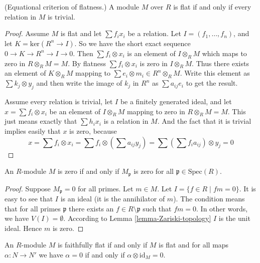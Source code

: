 \begin{lemma}
\label{lemma-flat-eq}
(Equational criterion of flatness.)
A module $M$ over $R$ is flat if and only if
every relation in $M$ is trivial.
\end{lemma}

\begin{proof}
Assume $M$ is flat and let $\sum f_i x_i$ be a relation.
Let $I = (f_1,\ldots,f_n)$, and let $K = \text{ker}(R^n \to I)$.
So we have the short exact sequence
$0\to K \to R^n \to I\to 0$. Then $\sum f_i \otimes x_i$
is an element of $I\otimes_R M$ which maps
to zero in $R\otimes_R M = M$. By flatness
$\sum f_i \otimes x_i$ is zero in $I\otimes_R M$.
Thus there exists an element of $K\otimes_R M$ mapping
to $\sum e_i \otimes m_i \in R^n\otimes_R M$.
Write this element as $\sum k_j \otimes y_j$
and then write the image of $k_j$ in $R^n$ as
$\sum a_{ij} e_i$ to get the result.

\medskip\noindent
Assume every relation is trivial, let $I$
be a finitely generated ideal, and let $x = \sum f_i\otimes x_i$
be an element of $I\otimes_R M$ mapping to zero in $R\otimes_R M = M$.
This just means exactly that $\sum h_i x_i$ is a relation in
$M$. And the fact that it is trivial implies easily that
$x$ is zero, because
$$
x
=
\sum f_i \otimes x_i
=
\sum f_i \otimes (\sum a_{ij}y_j)
=
\sum (\sum f_i a_{ij}) \otimes y_j
=
0
$$
\end{proof}

\begin{lemma}
\label{lemma-characterize-zero-local}
An $R$-module $M$ is zero if and only if $M_{\mathfrak p}$ is
zero for all $\mathfrak p \in \text{Spec}(R)$.
\end{lemma}

\begin{proof}
Suppose $M_{\mathfrak p} = 0$ for all primes. 
Let $m \in M$. Let $I = \{f \in R \mid fm = 0\}$.
It is easy to see that $I$ is an ideal (it is the
annihilator of $m$). The condition means that for
all primes $\mathfrak p$ there exists an $f \in R \setminus
\mathfrak p$ such that $fm =0$. In other words,
we have $V(I) = \emptyset$. According to Lemma 
\ref{lemma-Zariski-topology} $I$ is the unit ideal.
Hence $m$ is zero.
\end{proof}

\begin{lemma}
\label{lemma-easy-ff}
An $R$-module $M$ is faithfully flat if and only if $M$ is flat
and for all maps $\alpha : N \to N'$ we have 
$\alpha = 0$ if and only if $\alpha \otimes \text{id}_M = 0$.
\end{lemma}


